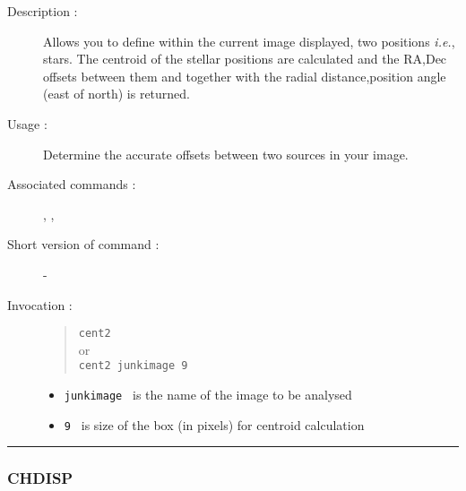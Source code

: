 \begin{description}

\item[Description :] Allows you to define within the current image
displayed, two positions \emph{i.e.}, stars. The centroid of the
stellar positions are calculated and the RA,Dec offsets between them
and together with the radial distance,position angle (east of north) is
returned.

\item[Usage :] Determine the accurate offsets between two sources in your image.
\item[Associated commands :] {\tt {}},
{\tt {}}, {\tt {}}

\item[Short version of command :] -
\item[Invocation :]

\begin{quote}{\tt  cent2 }\\ or \\ {\tt cent2 junkimage 9 } \end{quote}

\begin{itemize}

\item {\tt junkimage } is the name of the image to be analysed \item
{\tt 9 } is size of the box (in pixels) for centroid calculation

\end{itemize}

\end{description}

\hrule
\subsubsection*{\label{CHDISP}CHDISP}

